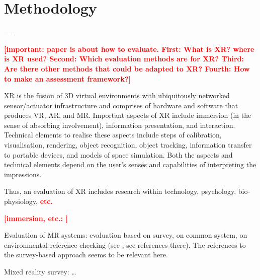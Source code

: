 \documentclass[11pt,english]{nik}
\newcommand{\WVL}[1]{\textbf{\textcolor{red}{#1}}}
\begin{document}
\section{Methodology}

----

\WVL{[important: paper is about how to evaluate. First: What is XR? where is XR used? Second: Which evaluation methods are for XR? Third: Are there other methods that could be adapted to XR? Fourth: How to make an assessment framework?]}

XR
is the fusion of 3D virtual environments with ubiquitously networked sensor/actuator infrastructure \autocite{paradiso2009guest} and comprises of hardware and software that produces VR, AR, and MR.
Important aspects of XR include immersion (in the sense of absorbing involvement), information presentation, and interaction. 
Technical elements to realise these aspects include steps of calibration, visualisation, rendering, object recognition, object tracking, information transfer to portable devices, and models of space simulation.
Both the aspects and technical elements depend on the user's senses and capabilities of interpreting the impressions. 

Thus, an evaluation of XR includes research within technology, psychology, bio-physiology, \WVL{etc.}

\WVL{[immersion, etc.:  \autocite{Tjostheim1430618} ]}

Evaluation of MR systems: evaluation based on survey, on common system, on environmental reference checking (see \citet[p.13][]{rokhsaritalemiReviewMixedReality2020}; see  references there). The references to the survey-based approach seems to be relevant here. 

Mixed reality survey: \autocite{Costanza2009} \dots
\end{document}
